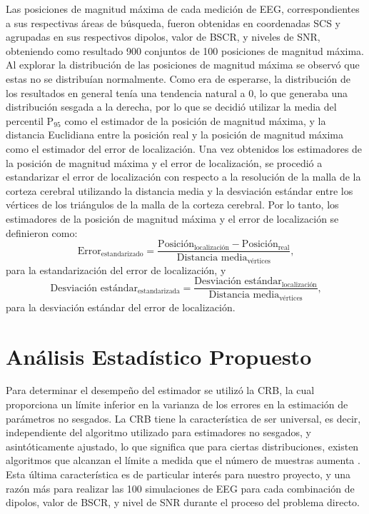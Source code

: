 Las posiciones de magnitud máxima de cada medición de EEG, correspondientes a sus respectivas áreas de búsqueda, fueron obtenidas en coordenadas SCS y agrupadas en sus respectivos dipolos, valor de BSCR, y niveles de SNR, obteniendo como resultado 900 conjuntos de 100 posiciones de magnitud máxima. 
Al explorar la distribución de las posiciones de magnitud máxima se observó que estas no se distribuían normalmente.
Como era de esperarse, la distribución de los resultados en general tenía una tendencia natural a 0, lo que generaba una distribución sesgada a la derecha, por lo que se decidió utilizar la media del percentil P$_{95}$ como el estimador de la posición de magnitud máxima, y la distancia Euclidiana entre la posición real y la posición de magnitud máxima como el estimador del error de localización.
Una vez obtenidos los estimadores de la posición de magnitud máxima y el error de localización, se procedió a estandarizar el error de localización con respecto a la resolución de la malla de la corteza cerebral utilizando la distancia media y la desviación estándar entre los vértices de los triángulos de la malla de la corteza cerebral.
Por lo tanto, los estimadores de la posición de magnitud máxima y el error de localización se definieron como:
\begin{equation}
	\label{eq:mean_error}
	\text{Error}_{\text{estandarizado}} = \frac{\text{Posición}_{\text{localización}}-\text{Posición}_{\text{real}}}{\text{Distancia media}_{\text{vértices}}}\text{,}
\end{equation}
para la estandarización del error de localización, y
\begin{equation}
	\label{eq:sd_error}
	\text{Desviación estándar}_{\text{estandarizada}} = \frac{\text{Desviación estándar}_{\text{localización}}}{\text{Distancia media}_{\text{vértices}}}\text{,}
\end{equation}
para la desviación estándar del error de localización.

\section{Análisis Estadístico Propuesto}
\label{sec:methodology:cbr-analysis}

Para determinar el desempeño del estimador se utilizó la CRB, la cual proporciona un límite inferior en la varianza de los errores en la estimación de parámetros no sesgados.
La CRB tiene la característica de ser universal, es decir, independiente del algoritmo utilizado para estimadores no sesgados, y asintóticamente ajustado, lo que significa que para ciertas distribuciones, existen algoritmos que alcanzan el límite a medida que el número de muestras aumenta \cite{Muravchik1999, Escalona-Vargas2013}.
Esta última característica es de particular interés para nuestro proyecto, y una razón más para realizar las 100 simulaciones de EEG para cada combinación de dipolos, valor de BSCR, y nivel de SNR durante el proceso del problema directo.

